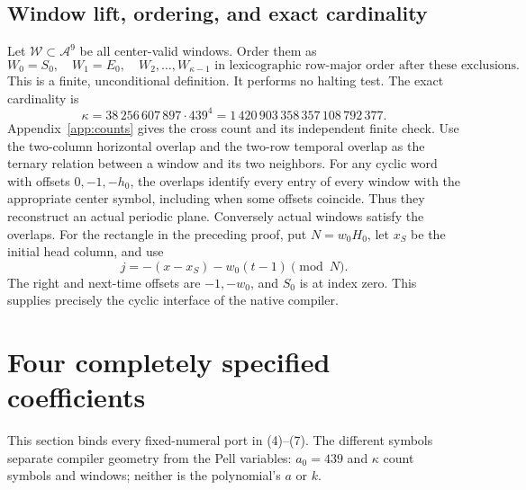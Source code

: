 \documentclass[11pt,a4paper]{article}
\theoremstyle{definition}
\theoremstyle{remark}
\begin{document}
\subsection{Window lift, ordering, and exact cardinality}
Let \(\mathcal W\subset\mathcal A^9\) be all center-valid windows.
Order them as
\[
 W_0=S_0,\quad W_1=E_0,\quad
 W_2,\ldots,W_{\kappa-1}
 \text{ in lexicographic row-major order after these exclusions}.
 \tag{13}
\]
This is a finite, unconditional definition. It performs no halting
test. The exact cardinality is
\[
 \kappa=38\,256\,607\,897\cdot439^4
       =1\,420\,903\,358\,357\,108\,792\,377.
 \tag{14}
\]
Appendix~\ref{app:counts} gives the cross count and its independent
finite check.
Use the two-column horizontal overlap and the two-row temporal overlap
as the ternary relation between a window and its two neighbors.
For any cyclic word with offsets \(0,-1,-h_0\), the overlaps identify
every entry of every window with the appropriate center symbol,
including when some offsets coincide. Thus they reconstruct an actual
periodic plane. Conversely actual windows satisfy the overlaps.
For the rectangle in the preceding proof, put \(N=w_0H_0\), let
\(x_S\) be the initial head column, and use
\[
 j=-(x-x_S)-w_0(t-1)\pmod N. \tag{15}
\]
The right and next-time offsets are \(-1,-w_0\), and \(S_0\) is at
index zero. This supplies precisely the cyclic interface of the
native compiler.

\section{Four completely specified coefficients}\label{sec:constants}
This section binds every fixed-numeral port in (4)--(7).
The different symbols separate compiler geometry from
the Pell variables: \(a_0=439\) and \(\kappa\) count symbols and
windows; neither is the polynomial's \(a\) or \(k\).
\end{document}
